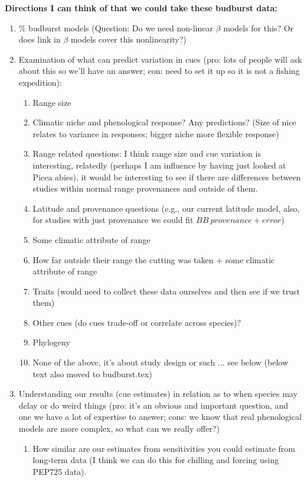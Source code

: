 \documentclass[11pt,letterpaper]{article}
\begin{document}
{\bf Directions I can think of that we could take these budburst data:}
\begin{enumerate}
\item \% budburst models (Question: Do we need non-linear $\beta$ models for this? Or does link in $\beta$ models cover this nonlinearity?)
\item Examination of what can predict variation in cues (pro: lots of people will ask about this so we'll have an answer; con: need to set it up so it is not a fishing expedition):
\begin{enumerate}
\item Range size
\item Climatic niche and phenological response? Any predictions? (Size of nice relates to variance in responses; bigger niche more flexible response)
\item Range related questions: I think range size and cue variation is interesting, relatedly (perhaps I am influence by having just looked at Picea abies), it would be interesting to see if there are differences between studies within normal range provenances and outside of them.
\item Latitude and provenance questions (e.g., our current latitude model, also, for studies with just provenance we could fit $BB~provenance+error$)
\item Some climatic attribute of range
\item How far outside their range the cutting was taken + some climatic attribute of range
\item Traits (would need to collect these data ourselves and then see if we trust them)
\item Other cues (do cues trade-off or correlate across species)?
\item Phylogeny
\item None of the above, it's about study design or such ... see below (below text also moved to budburst.tex) %
\end{enumerate}
\item Understanding our results (cue estimates) in relation as to when species may delay or do weird things (pro: it's an obvious and important question, and one we have a lot of expertise to answer; cons: we know that real phenological models are more complex, so what can we really offer?) 
\begin{enumerate}
\item How similar are our estimates from sensitivities you could estimate from long-term data (I think we can do this for chilling and forcing using PEP725 data).

\end{enumerate}
\end{enumerate}
\end{document}
